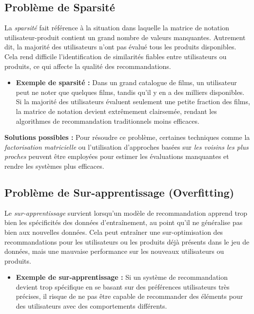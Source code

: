 \subsection{Problème de Sparsité}

La \textit{sparsité} fait référence à la situation dans laquelle la matrice de notation utilisateur-produit contient un grand nombre de valeurs manquantes. Autrement dit, la majorité des utilisateurs n'ont pas évalué tous les produits disponibles. Cela rend difficile l’identification de similarités fiables entre utilisateurs ou produits, ce qui affecte la qualité des recommandations.

\begin{itemize}
    \item \textbf{Exemple de sparsité :} Dans un grand catalogue de films, un utilisateur peut ne noter que quelques films, tandis qu'il y en a des milliers disponibles. Si la majorité des utilisateurs évaluent seulement une petite fraction des films, la matrice de notation devient extrêmement clairsemée, rendant les algorithmes de recommandation traditionnels moins efficaces.
\end{itemize}

\textbf{Solutions possibles :} Pour résoudre ce problème, certaines techniques comme la \textit{factorisation matricielle} ou l’utilisation d'approches basées sur \textit{les voisins les plus proches} peuvent être employées pour estimer les évaluations manquantes et rendre les systèmes plus efficaces.

\subsection{Problème de Sur-apprentissage (Overfitting)}

Le \textit{sur-apprentissage} survient lorsqu’un modèle de recommandation apprend trop bien les spécificités des données d’entraînement, au point qu'il ne généralise pas bien aux nouvelles données. Cela peut entraîner une sur-optimisation des recommandations pour les utilisateurs ou les produits déjà présents dans le jeu de données, mais une mauvaise performance sur les nouveaux utilisateurs ou produits.

\begin{itemize}
    \item \textbf{Exemple de sur-apprentissage :} Si un système de recommandation devient trop spécifique en se basant sur des préférences utilisateurs très précises, il risque de ne pas être capable de recommander des éléments pour des utilisateurs avec des comportements différents.
\end{itemize}

